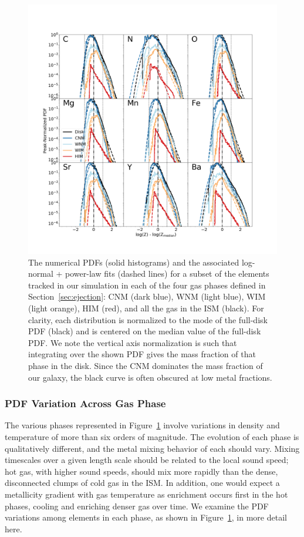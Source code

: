 \begin{figure}
\centering
\includegraphics[width=0.95\linewidth]{figures/ch3/DD0390_element_by_element}
\caption{The numerical PDFs (solid histograms) and the associated log-normal + power-law fits (dashed lines) for a subset of the elements tracked in our simulation in each of the four gas phases defined in Section~\ref{sec:ejection}: CNM (dark blue), WNM (light blue), WIM (light orange), HIM (red), and all the gas in the ISM (black). For clarity, each distribution is normalized to the mode of the full-disk PDF (black) and is centered on the median value of the full-disk PDF. We note the vertical axis normalization is such that integrating over the shown PDF gives the mass fraction of that phase in the disk. Since the CNM dominates the mass fraction of our galaxy, the black curve is often obscured at low metal fractions.}
\label{fig:log-normal}
\end{figure}

\subsubsection{PDF Variation Across Gas Phase}
\label{sec:phase-pdfs}

The various phases represented in Figure~\ref{fig:log-normal} involve variations in density and temperature of more than six orders of magnitude. The evolution of each phase is qualitatively different, and the metal mixing behavior of each should vary. Mixing timescales over a given length scale should be related to the local sound speed; hot gas, with higher sound speeds, should mix more rapidly than the dense, disconnected clumps of cold gas in the ISM. In addition, one would expect a metallicity gradient with gas temperature as enrichment occurs first in the hot phases, cooling and enriching denser gas over time. We examine the PDF variations among elements in each phase, as shown in Figure~\ref{fig:log-normal}, in more detail here.

